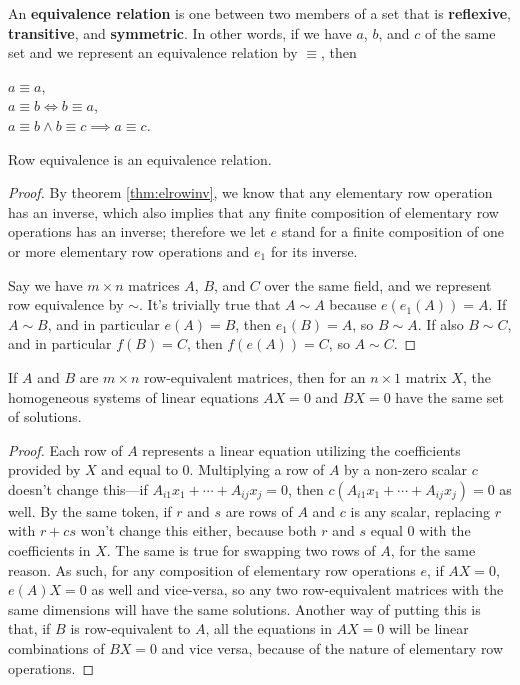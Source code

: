\documentclass[12pt]{article}
\begin{document}
\begin{defn}
  An \textbf{equivalence relation} is one between two members of
  a set that is \textbf{reflexive}, \textbf{transitive}, and
  \textbf{symmetric}. In other words, if we have $a$, $b$, and
  $c$ of the same set and we represent an equivalence relation by
  $\equiv$, then
  \begin{center}
    $a \equiv a$,\\
    $a \equiv b \iff b \equiv a$,\\
    $a \equiv b \land b \equiv c \implies a \equiv c$.
  \end{center}
\end{defn}

\begin{cor} \label{cor:rowequivisequivrel}
  Row equivalence is an equivalence relation.
  \begin{proof}
    By theorem \ref{thm:elrowinv}, we know that any elementary
    row operation has an inverse, which also implies that any
    finite composition of elementary row operations has an
    inverse; therefore we let $e$ stand for a finite composition
    of one or more elementary row operations and $e_1$ for its
    inverse.

    Say we have $m \times n$ matrices $A$, $B$, and $C$ over the
    same field, and we represent row equivalence by $\sim$. It's
    trivially true that $A \sim A$ because $e(e_{1}(A)) = A$. If
    $A \sim B$, and in particular $e(A) = B$, then $e_{1}(B) =
    A$, so $B \sim A$. If also $B \sim C$, and in particular
    $f(B) = C$, then $f(e(A)) = C$, so $A \sim C$.
  \end{proof}
\end{cor}

\begin{thm} \label{thm:roweqsamesol}
  If $A$ and $B$ are $m \times n$ row-equivalent matrices, then
  for an $n \times 1$ matrix $X$, the homogeneous systems of
  linear equations $AX = 0$ and $BX = 0$ have the same set of
  solutions.
  \begin{proof}
    Each row of $A$ represents a linear equation utilizing the
    coefficients provided by $X$ and equal to $0$.  Multiplying a
    row of $A$ by a non-zero scalar $c$ doesn't change this—if
    $A_{i1}x_1 + \cdots + A_{ij}x_j = 0$, then $c(A_{i1}x_1 +
    \cdots + A_{ij}x_j) = 0$ as well. By the same token, if $r$
    and $s$ are rows of $A$ and $c$ is any scalar, replacing $r$
    with $r + cs$ won't change this either, because both $r$ and
    $s$ equal $0$ with the coefficients in $X$. The same is true
    for swapping two rows of $A$, for the same reason. As such,
    for any composition of elementary row operations $e$, if $AX
    = 0$, $e(A)X = 0$ as well and vice-versa, so any two
    row-equivalent matrices with the same dimensions will have
    the same solutions. Another way of putting this is that, if
    $B$ is row-equivalent to $A$, all the equations in $AX = 0$
    will be linear combinations of $BX = 0$ and vice versa,
    because of the nature of elementary row operations.
  \end{proof}
\end{thm}
\end{document}

